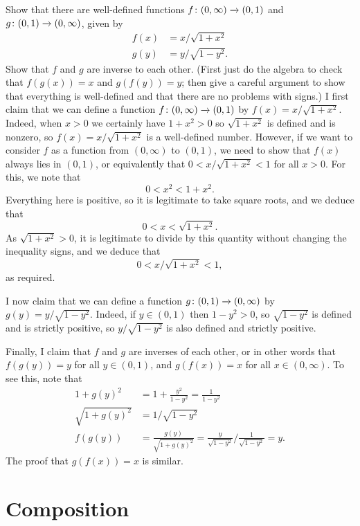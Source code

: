 \documentclass[a4paper]{book}
\theoremstyle{definition}
\newenvironment{starex}{
 \renewcommand{\thetheorem}{\arabic{chapter}.\arabic{section}.\arabic{theorem}${}^*$}
 \exercise
}{\endexercise}
\renewenvironment{solution}{\SolutionInline}{\endSolutionInline}
\begin{document}
\begin{starex}
 Show that there are well-defined functions $f\colon(0,\infty)\xrightarrow{}(0,1)$
 and $g\colon(0,1)\xrightarrow{}(0,\infty)$, given by
 \begin{align*}
  f(x) &= x/\sqrt{1+x^2} \\
  g(y) &= y/\sqrt{1-y^2}.
 \end{align*}
 Show that $f$ and $g$ are inverse to each other.  (First just do the
 algebra to check that $f(g(x))=x$ and $g(f(y))=y$; then give a
 careful argument to show that everything is well-defined and that
 there are no problems with signs.)
\end{starex}
\begin{solution}
 I first claim that we can define a function
 $f\colon(0,\infty)\xrightarrow{}(0,1)$ by $f(x)=x/\sqrt{1+x^2}$.  Indeed, when
 $x>0$ we certainly have $1+x^2>0$ so $\sqrt{1+x^2}$ is defined and is
 nonzero, so $f(x)=x/\sqrt{1+x^2}$ is a well-defined number.  However,
 if we want to consider $f$ as a function from $(0,\infty)$ to
 $(0,1)$, we need to show that $f(x)$ always lies in $(0,1)$, or
 equivalently that $0<x/\sqrt{1+x^2}<1$ for all $x>0$.  For this, we
 note that
 \[ 0< x^2 < 1+x^2. \]
 Everything here is positive, so it is legitimate to take square
 roots, and we deduce that
 \[ 0< x < \sqrt{1+x^2}. \]
 As $\sqrt{1+x^2}>0$, it is legitimate to divide by this quantity
 without changing the inequality signs, and we deduce that
 \[ 0 < x/\sqrt{1+x^2} < 1, \]
 as required.

 I now claim that we can define a function $g\colon(0,1)\xrightarrow{}(0,\infty)$
 by $g(y)=y/\sqrt{1-y^2}$.  Indeed, if $y\in(0,1)$ then $1-y^2>0$, so
 $\sqrt{1-y^2}$ is defined and is strictly positive, so
 $y/\sqrt{1-y^2}$ is also defined and strictly positive.

 Finally, I claim that $f$ and $g$ are inverses of each other, or in
 other words that $f(g(y))=y$ for all $y\in(0,1)$, and $g(f(x))=x$ for
 all $x\in(0,\infty)$.  To see this, note that
 \begin{align*}
  1 + g(y)^2 &= 1 + \frac{y^2}{1-y^2} = \frac{1}{1-y^2} \\
  \sqrt{1+g(y)^2} &= 1/\sqrt{1-y^2} \\
  f(g(y)) &= \frac{g(y)}{\sqrt{1+g(y)^2}}
           = \frac{y}{\sqrt{1-y^2}}/ \frac{1}{\sqrt{1-y^2}} = y.
 \end{align*}
 The proof that $g(f(x))=x$ is similar.
\end{solution}


\section{Composition}
\label{sec-composition}
\end{document}
